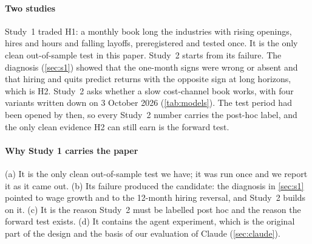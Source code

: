 \paragraph{Two studies} Study~1 traded H1: a monthly book long the industries with rising openings, hires and hours and falling layoffs, preregistered and tested once. It is the only clean out-of-sample test in this paper. Study~2 starts from its failure. The diagnosis (\cref{sec:s1}) showed that the one-month signs were wrong or absent and that hiring and quits predict returns with the opposite sign at long horizons, which is H2. Study~2 asks whether a slow cost-channel book works, with four variants written down on 3 October 2026 (\cref{tab:models}). The test period had been opened by then, so every Study~2 number carries the post-hoc label, and the only clean evidence H2 can still earn is the forward test.

\paragraph{Why Study 1 carries the paper}\label{par:carries} (a) It is the only clean out-of-sample test we have; it was run once and we report it as it came out. (b) Its failure produced the candidate: the diagnosis in \cref{sec:s1} pointed to wage growth and to the 12-month hiring reversal, and Study~2 builds on it. (c) It is the reason Study~2 must be labelled post hoc and the reason the forward test exists. (d) It contains the agent experiment, which is the original part of the design and the basis of our evaluation of Claude (\cref{sec:claude}).

